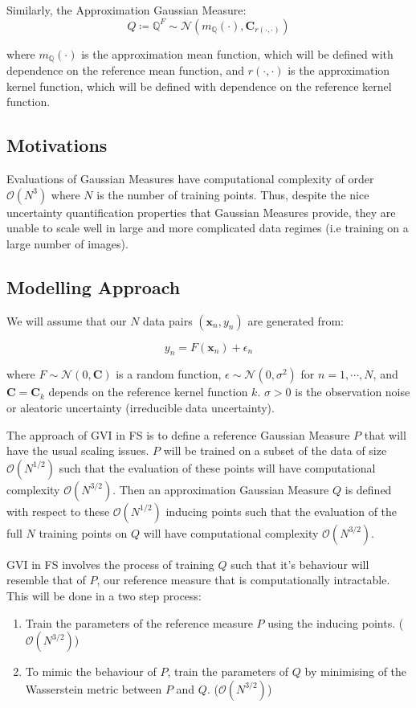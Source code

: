 \documentclass[twoside,11pt]{article}
\begin{document}
Similarly, the Approximation Gaussian Measure:
\[Q \coloneqq \mathbb{Q}^{F} \sim \mathcal{N} (m_{\mathbb{Q}}(\cdot), \mathbf{C}_{r(\cdot, \cdot)})\]

where $m_{\mathbb{Q}}(\cdot)$ is the approximation mean function, which will be defined with dependence on the reference mean function, and $r(\cdot, \cdot)$ is the approximation kernel function, which will be defined with dependence on the reference kernel function.

\subsection{Motivations}\label{sec:motivations}


Evaluations of Gaussian Measures have computational complexity of order $\mathcal{O}(N^3)$ where $N$ is the number of training points.
Thus, despite the nice uncertainty quantification properties that Gaussian Measures provide, they are unable to scale well in large and more complicated data regimes (i.e training on a large number of images).


\subsection{Modelling Approach}\label{sec:modelling-approach}


We will assume that our $N$ data pairs $(\mathbf{x}_n, y_n)$ are generated from:

\[y_n = F(\mathbf{x}_n) + \epsilon_n\]

where $F \sim \mathcal{N}(0, \mathbf{C})$ is a random function, $\epsilon \sim \mathcal{N}(0, \sigma^2)$ for $n=1, \cdots, N$, and $\mathbf{C} = \mathbf{C}_{k}$ depends on the reference kernel function $k$.
$\sigma >0$ is the observation noise or aleatoric uncertainty (irreducible data uncertainty).

The approach of GVI in FS is to define a reference Gaussian Measure $P$ that will have the usual scaling issues.
$P$ will be trained on a subset of the data of size $\mathcal{O}\left(N^{1/2}\right)$ such that the evaluation of these points will have computational complexity $\mathcal{O}\left(N^{3/2}\right)$.
Then an approximation Gaussian Measure $Q$ is defined with respect to these $\mathcal{O}\left(N^{1/2}\right)$ inducing points such that the evaluation of the full $N$ training points on $Q$ will have computational complexity $\mathcal{O}\left(N^{3/2}\right)$.

GVI in FS involves the process of training $Q$ such that it's behaviour will resemble that of $P$, our reference measure that is computationally intractable.
This will be done in a two step process:
\begin{enumerate}
    \item Train the parameters of the reference measure $P$ using the inducing points. ($\mathcal{O}(N^{3/2})$)
    \item To mimic the behaviour of $P$, train the parameters of $Q$ by minimising of the Wasserstein metric between $P$ and $Q$. ($\mathcal{O}(N^{3/2})$)
\end{enumerate}
\end{document}
